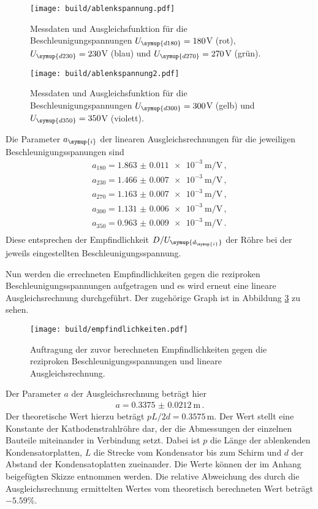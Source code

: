 \begin{figure}[h!]
  \centering
  \texttt{[image: build/ablenkspannung.pdf]}
  \caption{Messdaten und Ausgleichsfunktion für die Beschleunigungspannungen
  $U_{\symup{d180}}=180$V (rot), $U_{\symup{d230}}=230$V (blau) und $U_{\symup{d270}}=270$V (grün).}
  \label{fig:ablenkspannung}
\end{figure}

\begin{figure}[h!]
  \centering
  \texttt{[image: build/ablenkspannung2.pdf]}
  \caption{Messdaten und Ausgleichsfunktion für die Beschleunigungspannungen
  $U_{\symup{d300}}=300$V (gelb) und $U_{\symup{d350}}=350$V (violett).}
  \label{fig:ablenkspannung2}
\end{figure}

Die Parameter $a_{\symup{i}}$ der linearen Ausgleichsrechnungen für die jeweiligen
Beschleunigungsspanungen sind
\begin{align*}
  a_{180} = \SI{1.863(0011)e-3}{\meter\per\volt} \,, \\
  a_{230} = \SI{1.466(0007)e-3}{\meter\per\volt}  \,, \\
  a_{270} = \SI{1.163(0007)e-3}{\meter\per\volt}  \,,\\
  a_{300} = \SI{1.131(0006)e-3}{\meter\per\volt}  \,,\\
  a_{350} = \SI{0.963(0009)e-3}{\meter\per\volt} \,.\\
\end{align*}
Diese entsprechen der Empfindlichkeit $D/U_{\symup{d_{\symup{i}}}}$ der Röhre bei
der jeweils eingestellten Beschleunigungsspannung.

Nun werden die errechneten Empfindlichkeiten gegen die reziproken Beschleunigungsspannungen
aufgetragen und es wird erneut eine lineare Ausgleichsrechnung durchgeführt. Der
zugehörige Graph ist in Abbildung \ref{fig:empfindlichkeiten} zu sehen.

\begin{figure}[h!]
  \centering
  \texttt{[image: build/empfindlichkeiten.pdf]}
  \caption{Auftragung der zuvor berechneten Empfindlichkeiten gegen die reziproken
  Beschleunigungsspannungen und lineare Ausgleichsrechnung.}
  \label{fig:empfindlichkeiten}
\end{figure}

Der Parameter $a$ der Ausgleichsrechnung beträgt hier
\begin{align*}
  a=\SI{0.3375(00212)}{\meter} \,.
\end{align*}
Der theoretische Wert hierzu beträgt $pL/2d=0.3575\,$m. Der Wert stellt eine
Konstante der Kathodenstrahlröhre dar, der die Abmessungen der einzelnen Bauteile
miteinander in Verbindung setzt. Dabei ist $p$ die
Länge der ablenkenden Kondensatorplatten, $L$ die Strecke vom Kondensator bis zum
Schirm und $d$ der Abstand der Kondensatoplatten zueinander. Die Werte können der
im Anhang beigefügten Skizze entnommen werden. Die relative Abweichung
des durch die Ausgleichsrechnung ermittelten Wertes vom theoretisch berechneten Wert
beträgt $-5.59\%$.




